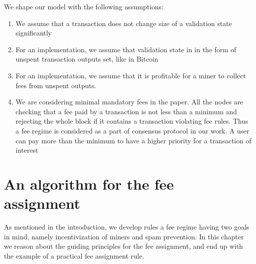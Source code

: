 \documentclass[]{llncs}   %
\begin{document}
We shape our model with the following assumptions:
\begin{enumerate}[label=\textbf{A\arabic*. }]
  \item We assume that a transaction does not change size of a validation state significantly
  \item For an implementation, we assume that validation state in in the form of unspent transaction outputs set, like in Bitcoin
  \item For an implementation, we assume that it is profitable for a miner to collect fees from unspent outputs. 
  \item We are considering minimal mandatory fees in the paper. All the nodes
      are checking that a fee paid by a transaction is not less than a minimum
      and rejecting the whole block if it contains a transaction violating fee
      rules. Thus a fee regime is considered as a part of consensus protocol in
      our work. A user can pay more than the minimum to have a higher priority
      for a transaction of interest
\end{enumerate}


\section{An algorithm for the fee assignment}
\label{sec:algorithm}

As mentioned in the introduction, we develop rules a fee regime having two goals
in mind, namely incentivization of miners and spam prevention.  In this chapter
we reason about the guiding  principles for the fee assignment, and end up with
the example of a practical fee assignment rule.
\end{document}
